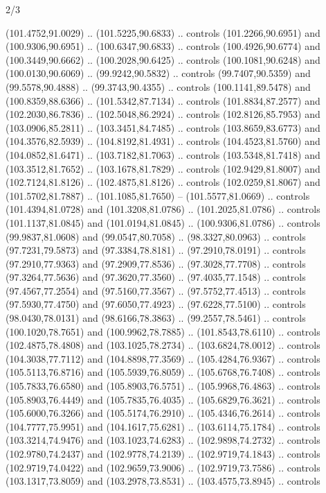 \begin{flagdescription}{2/3}
\begin{scope}[shift={(0.5\flaglength,0.5)},scale=\flagwidth/320]
\begin{scope}[y=0.8pt, x=0.8pt, yscale=-1,shift={(-118.3,-146)}]
  (101.4752,91.0029) .. (101.5225,90.6833) .. controls (101.2266,90.6951) and
  (100.9306,90.6951) .. (100.6347,90.6833) .. controls (100.4926,90.6774) and
  (100.3449,90.6662) .. (100.2028,90.6425) .. controls (100.1081,90.6248) and
  (100.0130,90.6069) .. (99.9242,90.5832) .. controls (99.7407,90.5359) and
  (99.5578,90.4888) .. (99.3743,90.4355) .. controls (100.1141,89.5478) and
  (100.8359,88.6366) .. (101.5342,87.7134) .. controls (101.8834,87.2577) and
  (102.2030,86.7836) .. (102.5048,86.2924) .. controls (102.8126,85.7953) and
  (103.0906,85.2811) .. (103.3451,84.7485) .. controls (103.8659,83.6773) and
  (104.3576,82.5939) .. (104.8192,81.4931) .. controls (104.4523,81.5760) and
  (104.0852,81.6471) .. (103.7182,81.7063) .. controls (103.5348,81.7418) and
  (103.3512,81.7652) .. (103.1678,81.7829) .. controls (102.9429,81.8007) and
  (102.7124,81.8126) .. (102.4875,81.8126) .. controls (102.0259,81.8067) and
  (101.5702,81.7887) .. (101.1085,81.7650) -- (101.5577,81.0669) .. controls
  (101.4394,81.0728) and (101.3208,81.0786) .. (101.2025,81.0786) .. controls
  (101.1137,81.0845) and (101.0194,81.0845) .. (100.9306,81.0786) .. controls
  (99.9837,81.0608) and (99.0547,80.7058) .. (98.3327,80.0963) .. controls
  (97.7231,79.5873) and (97.3384,78.8181) .. (97.2910,78.0191) .. controls
  (97.2910,77.9363) and (97.2909,77.8536) .. (97.3028,77.7708) .. controls
  (97.3264,77.5636) and (97.3620,77.3560) .. (97.4035,77.1548) .. controls
  (97.4567,77.2554) and (97.5160,77.3567) .. (97.5752,77.4513) .. controls
  (97.5930,77.4750) and (97.6050,77.4923) .. (97.6228,77.5100) .. controls
  (98.0430,78.0131) and (98.6166,78.3863) .. (99.2557,78.5461) .. controls
  (100.1020,78.7651) and (100.9962,78.7885) .. (101.8543,78.6110) .. controls
  (102.4875,78.4808) and (103.1025,78.2734) .. (103.6824,78.0012) .. controls
  (104.3038,77.7112) and (104.8898,77.3569) .. (105.4284,76.9367) .. controls
  (105.5113,76.8716) and (105.5939,76.8059) .. (105.6768,76.7408) .. controls
  (105.7833,76.6580) and (105.8903,76.5751) .. (105.9968,76.4863) .. controls
  (105.8903,76.4449) and (105.7835,76.4035) .. (105.6829,76.3621) .. controls
  (105.6000,76.3266) and (105.5174,76.2910) .. (105.4346,76.2614) .. controls
  (104.7777,75.9951) and (104.1617,75.6281) .. (103.6114,75.1784) .. controls
  (103.3214,74.9476) and (103.1023,74.6283) .. (102.9898,74.2732) .. controls
  (102.9780,74.2437) and (102.9778,74.2139) .. (102.9719,74.1843) .. controls
  (102.9719,74.0422) and (102.9659,73.9006) .. (102.9719,73.7586) .. controls
  (103.1317,73.8059) and (103.2978,73.8531) .. (103.4575,73.8945) .. controls

\end{scope}
\end{scope}
\end{flagdescription}
